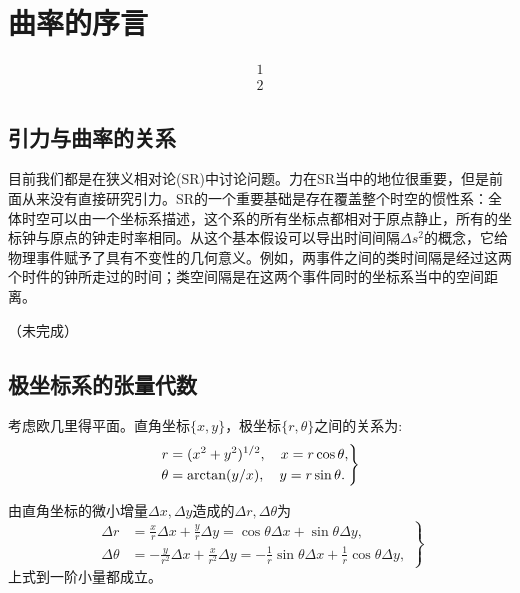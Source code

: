 \chapter{曲率的序言}
\label{chap5}

\begin{align}
    1\\2
\end{align}

\section{引力与曲率的关系}
\label{sec5.1}
目前我们都是在狭义相对论(SR)中讨论问题。力在SR当中的地位很重要，但是前面从来没有直接研究引力。SR的一个重要基础是存在覆盖整个时空的惯性系：全体时空可以由一个坐标系描述，这个系的所有坐标点都相对于原点静止，所有的坐标钟与原点的钟走时率相同。从这个基本假设可以导出时间间隔$\Delta s^2$的概念，它给物理事件赋予了具有不变性的几何意义。例如，两事件之间的类时间隔是经过这两个时件的钟所走过的时间；类空间隔是在这两个事件同时的坐标系当中的空间距离。

（未完成）

\section{极坐标系的张量代数}
\label{sec5.2}
考虑欧几里得平面。直角坐标$\{x, y\}$，极坐标$\{r, \theta\}$之间的关系为:
\begin{equation}
    \left.
    \begin{split}
    r &= (x^2 + y^2)^{1/2}, \quad x = r \cos \theta, \\
    \theta &= \operatorname{\mathrm{arctan}} (y / x), \quad y = r \sin \theta.
    \end{split}
    \right\}
\label{equ5.3}
\end{equation}

由直角坐标的微小增量$\Delta x, \Delta y$造成的$\Delta r, \Delta \theta$为
\begin{equation}
\left.
\begin{split}
    \Delta r &= \frac{x}{r} \Delta x + \frac{y}{r} \Delta y = \cos \theta \Delta x + \sin \theta \Delta y, \\
    \Delta \theta &= -\frac{y}{r^2} \Delta x + \frac{x}{r^2} \Delta y = -\frac{1}{r} \sin \theta \Delta x + \frac{1}{r} \cos \theta \Delta y,
\end{split}
\right\}
\label{equ5.4}
\end{equation}
上式到一阶小量都成立。

